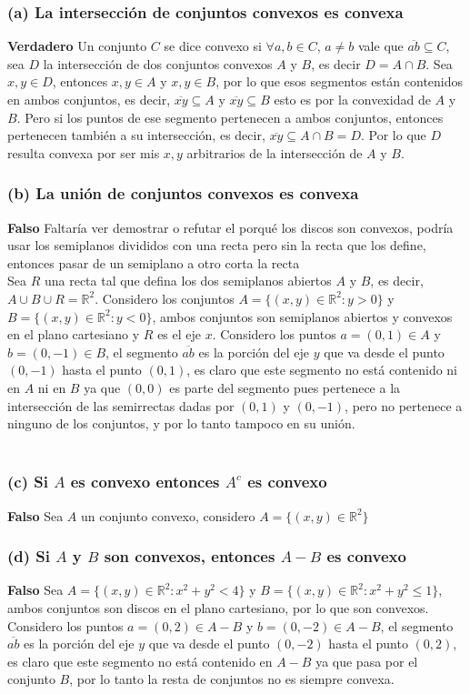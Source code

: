 \documentclass[a4paper]{article}
\begin{document}
\subsubsection{(a) La intersección de conjuntos convexos es convexa}
\textbf{Verdadero} Un conjunto $C$ se dice convexo si $\forall a,b \in C$, $a \neq b$ vale que $\overline{ab} \subseteq C$, sea $D$ la intersección de dos conjuntos convexos $A$ y $B$, es decir $D=A\cap B$. Sea $x,y \in D$, entonces $x,y \in A$ y $x,y \in B$, por lo que esos segmentos están contenidos en ambos conjuntos, es decir, $\overline{xy} \subseteq A$ y $\overline{xy} \subseteq B$ esto es por la convexidad de $A$ y $B$. Pero si los puntos de ese segmento pertenecen a ambos conjuntos, entonces pertenecen también a su intersección, es decir, $\overline{xy} \subseteq A\cap B = D$. Por lo que $D$ resulta convexa por ser mis $x,y$ arbitrarios de la intersección de $A$ y $B$.
\subsubsection{(b) La unión de conjuntos convexos es convexa}
\textbf{Falso} Faltaría ver demostrar o refutar el porqué los discos son convexos, podría usar los semiplanos divididos con una recta pero sin la recta que los define, entonces pasar de un semiplano a otro corta la recta\\
Sea $R$ una recta tal que defina los dos semiplanos abiertos $A$ y $B$, es decir, $A \cup B \cup R = \mathbb{R}^2$. Considero los conjuntos $A=\{(x,y) \in \mathbb{R}^2 : y > 0\}$ y $B=\{(x,y) \in \mathbb{R}^2 : y < 0\}$, ambos conjuntos son semiplanos abiertos y convexos en el plano cartesiano y $R$ es el eje $x$. Considero los puntos $a=(0,1) \in A$ y $b=(0,-1) \in B$, el segmento $\overline{ab}$ es la porción del eje $y$ que va desde el punto $(0,-1)$ hasta el punto $(0,1)$, es claro que este segmento no está contenido ni en $A$ ni en $B$ ya que $(0,0)$ es parte del segmento pues pertenece a la intersección de las semirrectas dadas por $(0,1)$ y $(0,-1)$, pero no pertenece a ninguno de los conjuntos, y por lo tanto tampoco en su unión.\\\\
\subsubsection{(c) Si $A$ es convexo entonces $A^{c}$ es convexo}
\textbf{Falso} Sea $A$ un conjunto convexo, considero $A=\{(x,y) \in \mathbb{R}^2 \}$
\subsubsection{(d) Si $A$ y $B$ son convexos, entonces $A-B$ es convexo}
\textbf{Falso} Sea $A=\{(x,y) \in \mathbb{R}^2 : x^2+y^2 < 4\}$ y $B=\{(x,y) \in \mathbb{R}^2 : x^2+y^2 \leq 1\}$, ambos conjuntos son discos en el plano cartesiano, por lo que son convexos. Considero los puntos $a=(0,2) \in A-B$ y $b=(0,-2) \in A-B$, el segmento $\overline{ab}$ es la porción del eje $y$ que va desde el punto $(0,-2)$ hasta el punto $(0,2)$, es claro que este segmento no está contenido en $A-B$ ya que pasa por el conjunto $B$, por lo tanto la resta de conjuntos no es siempre convexa.
\end{document}
